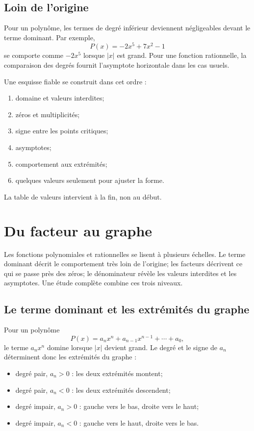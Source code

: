 \documentclass[12pt,a4paper,openany]{book}
\newcommand{\abs}[1]{\left\lvert #1\right\rvert}
\begin{document}
\subsection{Loin de l'origine}
Pour un polynôme, les termes de degré inférieur deviennent négligeables devant le terme dominant. Par exemple,
\[
P(x)=-2x^5+7x^2-1
\]
se comporte comme $-2x^5$ lorsque $|x|$ est grand. Pour une fonction rationnelle, la comparaison des degrés fournit l'asymptote horizontale dans les cas usuels.

\begin{visualbox}
Une esquisse fiable se construit dans cet ordre :
\begin{enumerate}
\item domaine et valeurs interdites;
\item zéros et multiplicités;
\item signe entre les points critiques;
\item asymptotes;
\item comportement aux extrémités;
\item quelques valeurs seulement pour ajuster la forme.
\end{enumerate}
La table de valeurs intervient à la fin, non au début.
\end{visualbox}


\section{Du facteur au graphe}

Les fonctions polynomiales et rationnelles se lisent à plusieurs échelles. Le terme dominant décrit le comportement très loin de l'origine; les facteurs décrivent ce qui se passe près des zéros; le dénominateur révèle les valeurs interdites et les asymptotes. Une étude complète combine ces trois niveaux.

\subsection{Le terme dominant et les extrémités du graphe}

Pour un polynôme
\[
P(x)=a_nx^n+a_{n-1}x^{n-1}+\cdots+a_0,
\]
le terme $a_nx^n$ domine lorsque $\abs x$ devient grand. Le degré et le signe de $a_n$ déterminent donc les extrémités du graphe :
\begin{itemize}
\item degré pair, $a_n>0$ : les deux extrémités montent;
\item degré pair, $a_n<0$ : les deux extrémités descendent;
\item degré impair, $a_n>0$ : gauche vers le bas, droite vers le haut;
\item degré impair, $a_n<0$ : gauche vers le haut, droite vers le bas.
\end{itemize}
\end{document}
